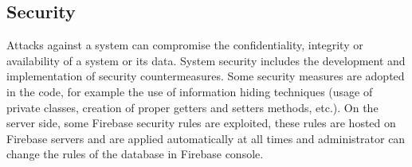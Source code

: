 \subsection{Security}
Attacks against a system can compromise the confidentiality, integrity or availability of a system or its data. System security includes the development and implementation of security countermeasures.
Some security measures are adopted in the code, for example the use of information hiding techniques (usage of private classes, creation of proper getters and setters methods, etc.).
On the server side, some Firebase security rules are exploited, these rules are hosted on Firebase servers and are applied automatically at all times and administrator can change the rules of the database in Firebase console.